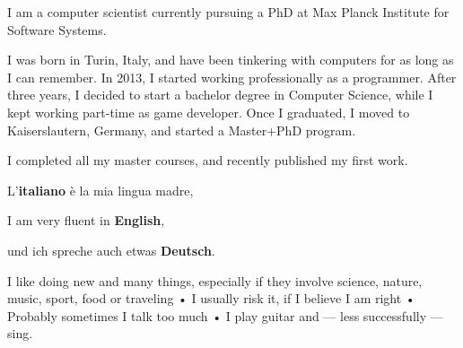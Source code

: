 


I am a computer scientist currently pursuing a PhD at Max Planck Institute for Software Systems. 

I was born in Turin, Italy, and have been tinkering with computers for as long as I can remember. In 2013, I started working professionally as a programmer. After three years, I decided to start a bachelor degree in Computer Science, while I kept working part-time as game developer. Once I graduated, I moved to Kaiserslautern, Germany, and started a Master+PhD program.

I completed all my master courses, and recently published my first work.


L'\textbf{italiano} è la mia lingua madre,

I am very fluent in \textbf{English},

und ich spreche auch etwas \textbf{Deutsch}.


I like doing new and many things, especially if they involve science, nature, music, sport, food or traveling • I usually risk it, if I believe I am right • Probably sometimes I talk too much • I play guitar and --- less successfully --- sing.


